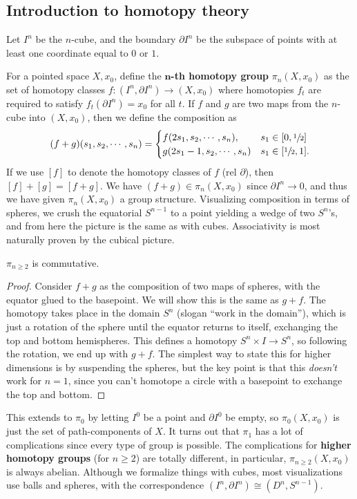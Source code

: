 \subsection{Introduction to homotopy theory}
Let $I^n $ be the $n$-cube, and the boundary $\partial I^n $ be the subspace of points with at least one coordinate equal to $0$ or $1$. 
\begin{definition}
    For a pointed space $X,x_0$, define the $\mathbf n$\textbf{-th homotopy group} $\pi_n (X,x_0)$ as the set of homotopy classes $f \colon (I^n ,\partial I^n ) \to (X,x_0)$ where homotopies $f_t$ are required to satisfy $f_t(\partial I^n )=x_0$ for all $t$. If $f$ and $g$ are two maps from the $n$-cube into $(X,x_0)$, then we define the composition as \[
        (f+g)(s_1,s_2,\cdots ,s_n )=
        \begin{cases}
            f(2s_1,s_2,\cdots ,s_n ),\quad & s_1\in [0,\sfrac{1}{2}]\\
            g(2s_1-1,s_2,\cdots ,s_n )&s_1\in [\sfrac{1}{2}, 1].
        \end{cases}
    \] 
    If we use $[f]$ to denote the homotopy classes of $f$ (rel $\partial $), then $[f]+[g]=[f+g]$. We have $(f+g)\in \pi_n (X,x_0)$ since $\partial I^n \to 0$, and thus we have given $\pi_n (X,x_0)$ a group structure. Visualizing composition in terms of spheres, we crush the equatorial $S^{n-1}$ to a point yielding a wedge of two $S^n $'s, and from here the picture is the same as with cubes. Associativity is most naturally proven by the cubical picture.
\end{definition}
\begin{theorem}
    $\pi_{n\geq 2} $ is commutative.
\end{theorem}
\begin{proof}
    Consider $f+g$ as the composition of two maps of spheres, with the equator glued to the basepoint. We will show this is the same as $g+f$. The homotopy takes place in the domain $S^n $ (slogan ``work in the domain''), which is just a rotation of the sphere until the equator returns to itself, exchanging the top and bottom hemispheres. This defines a homotopy $S^n \times I\to S^n $, so following the rotation, we end up with $g+f$. The simplest way to state this for higher dimensions is by suspending the spheres, but the key point is that this \emph{doesn't} work for $n=1$, since you can't homotope a circle with a basepoint to exchange the top and bottom.
\end{proof}
This extends to $\pi_0$ by letting $I^0$ be a point and $\partial I^0$ be empty, so $\pi_0(X,x_0)$ is just the set of path-components of $X$. It turns out that $\pi_1$ has a lot of complications since every type of group is possible. The complications for \textbf{higher homotopy groups} (for $n\geq 2$) are totally different, in particular, $\pi_{n\geq 2}(X,x_0)$ is always abelian. Although we formalize things with cubes, most visualizations use balls and spheres, with the correspondence $(I^n ,\partial I^n )\cong (D^n ,S^{n-1})$.
